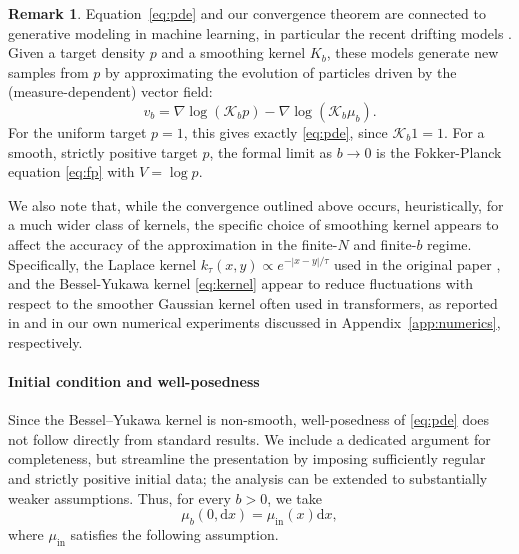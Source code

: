 \documentclass[11pt]{article}
\theoremstyle{definition}
\newtheorem{remark}[theorem]{Remark}
\def\Kb{\mathcal K_b}
\def\d{\mathrm{d}}
\begin{document}
\begin{remark}\label{rem:generative_modeling}
Equation~\eqref{eq:pde} and our convergence theorem are connected to generative modeling in machine learning, in particular the recent drifting models \cite{deng2026drifting,lai2026unified,turan2026drifting}. Given a target density $p$ and a smoothing kernel $K_b$, these models generate new samples from $p$ by approximating the evolution of particles driven by the (measure-dependent) vector field:
\[
v_b=\nabla\log(\Kb p)-\nabla\log(\Kb\mu_b).
\]
For the uniform target $p=1$, this gives exactly \eqref{eq:pde}, since $\Kb1=1$. For a smooth, strictly positive target $p$, the formal limit as $b\to0$ is the Fokker-Planck equation \eqref{eq:fp} with $V = \log p$.


We also note that, while the convergence outlined above occurs, heuristically, for a much wider class of kernels, the specific choice of smoothing kernel appears to affect the accuracy of the approximation in the  finite-$N$ and finite-$b$ regime. Specifically,  the Laplace kernel $k_\tau(x,y)\propto e^{-|x-y|/\tau}$ used in the original paper \cite{deng2026drifting}, and the Bessel-Yukawa kernel \eqref{eq:kernel} appear to  reduce fluctuations with respect to the smoother Gaussian kernel often used in transformers, as reported in \cite[Table~1]{turan2026drifting} and in our own numerical experiments discussed in Appendix~\ref{app:numerics}, respectively.
\end{remark}

\paragraph{Initial condition and well-posedness} Since the Bessel--Yukawa kernel is non-smooth, well-posedness of \eqref{eq:pde} does not follow directly from standard results. We include a dedicated argument for completeness, but streamline the presentation by imposing sufficiently regular and strictly positive initial data; the analysis can be extended to substantially weaker assumptions. Thus, for every $b>0$, we take
\[
\mu_b(0,\d x)=\mu_{\mathrm{in}}(x)\d x,
\]
where $\mu_{\mathrm{in}}$ satisfies the following assumption.
\end{document}
